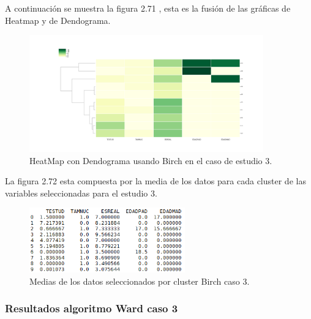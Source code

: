 	A continuación se muestra la figura 2.71 , esta es la fusión de las gráficas de 
	Heatmap y de Dendograma.  \\

	\begin{figure}[htb]
		\centering
		\includegraphics[width=0.9\textwidth]{./imagenes/caso3/heatmapcondendograma_caso3_Birch}
		\caption{HeatMap con Dendograma usando Birch en el caso de estudio 3.} \label{fig:1}
	\end{figure}

	La figura 2.72 esta compuesta por la media de los datos para cada cluster de las variables seleccionadas
	para el estudio 3. \\ 

	\begin{figure}[htb]
		\centering
		\includegraphics[width=0.6\textwidth]{./imagenes/caso3/medias_datos_caso3_Birch}
		\caption{Medias de los datos seleccionados por cluster Birch caso 3.} \label{fig:1}
	\end{figure}


	\subsubsection{Resultados algoritmo Ward caso 3}


